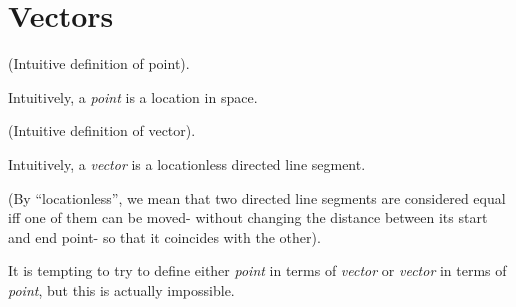 \section{Vectors}

\begin{defn}
    (Intuitive definition of point).
    
    Intuitively, a \textit{point} is a location in space.
\end{defn}

\begin{defn}
    (Intuitive definition of vector).
    
    Intuitively, a \textit{vector} is a locationless directed line segment. 
    
    (By ``locationless'', we mean that two directed line segments are considered equal iff one of them can be moved- without changing the distance between its start and end point- so that it coincides with the other).
\end{defn}

It is tempting to try to define either \textit{point} in terms of \textit{vector} or \textit{vector} in terms of \textit{point}, but this is actually impossible.

